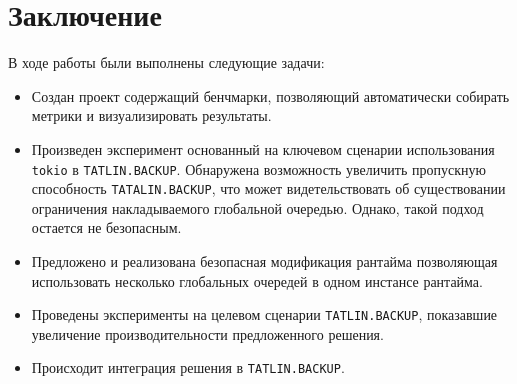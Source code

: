 
\section{Заключение}

В ходе работы были выполнены следующие задачи:

\begin{itemize}
    \item Создан проект содержащий бенчмарки, позволяющий автоматически собирать метрики и визуализировать результаты.
    \item Произведен эксперимент основанный на ключевом сценарии использования \verb|tokio| в \verb|TATLIN.BACKUP|. Обнаружена возможность увеличить пропускную способность \verb|TATALIN.BACKUP|, что может видетельствовать об существовании ограничения накладываемого глобальной очередью. Однако, такой подход остается не безопасным.
    \item Предложено и реализована безопасная модификация рантайма позволяющая использовать несколько глобальных очередей в одном инстансе рантайма.
    \item Проведены эксперименты на целевом сценарии \verb|TATLIN.BACKUP|, показавшие увеличение производительности предложенного решения.
    \item Происходит интеграция решения в \verb|TATLIN.BACKUP|.
\end{itemize}
